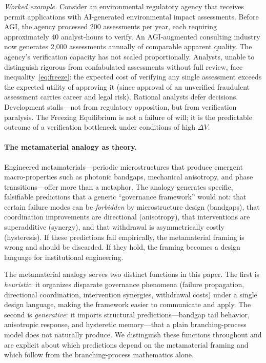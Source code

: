 \documentclass[runningheads]{llncs}
\begin{document}
\emph{Worked example.} Consider an environmental regulatory agency that receives permit applications with AI-generated environmental impact assessments. Before AGI, the agency processed 200 assessments per year, each requiring approximately 40 analyst-hours to verify. An AGI-augmented consulting industry now generates 2{,}000 assessments annually of comparable apparent quality. The agency's verification capacity has not scaled proportionally. Analysts, unable to distinguish rigorous from confabulated assessments without full review, face inequality~\eqref{eq:freeze}: the expected cost of verifying any single assessment exceeds the expected utility of approving it (since approval of an unverified fraudulent assessment carries career and legal risk). Rational analysts defer decisions. Development stalls---not from regulatory opposition, but from verification paralysis. The Freezing Equilibrium is not a failure of will; it is the predictable outcome of a verification bottleneck under conditions of high $\Delta V$.

\paragraph{The metamaterial analogy as theory.}
Engineered metamaterials---periodic microstructures that produce emergent macro-properties such as photonic bandgaps, mechanical anisotropy, and phase transitions---offer more than a metaphor. The analogy generates specific, falsifiable predictions that a generic ``governance framework'' would not: that certain failure modes can be \emph{forbidden} by microstructure design (bandgaps), that coordination improvements are directional (anisotropy), that interventions are superadditive (synergy), and that withdrawal is asymmetrically costly (hysteresis). If these predictions fail empirically, the metamaterial framing is wrong and should be discarded. If they hold, the framing becomes a design language for institutional engineering.

The metamaterial analogy serves two distinct functions in this paper. The first is \emph{heuristic}: it organizes disparate governance phenomena (failure propagation, directional coordination, intervention synergies, withdrawal costs) under a single design language, making the framework easier to communicate and apply. The second is \emph{generative}: it imports structural predictions---bandgap tail behavior, anisotropic response, and hysteretic memory---that a plain branching-process model does not naturally produce. We distinguish these functions throughout and are explicit about which predictions depend on the metamaterial framing and which follow from the branching-process mathematics alone.
\end{document}
